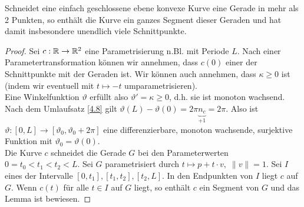 \documentclass[11pt]{scrbook}
\newcommand{\tta}{\vartheta}
\begin{document}
\begin{lem}
\label{5.8}
Schneidet eine einfach geschlossene ebene konvexe Kurve eine Gerade in mehr als 2 Punkten, so enthält die Kurve ein ganzes Segment dieser Geraden und hat damit insbesondere unendlich viele Schnittpunkte. \\
\begin{proof}
Sei $c: \mathbb{R} \to \mathbb{R}^2$ eine Parametrisierung n.Bl. mit Periode $L$. Nach einer Parametertransformation können wir annehmen, dass $c(0)$ einer der Schnittpunkte mit der Geraden ist. Wir können auch annehmen, dass $\kappa \geq 0$ ist (indem wir eventuell mit $t \mapsto -t$ umparametrisieren). \\
Eine Winkelfunktion $\tta$ erfüllt also $\tta' = \kappa \geq 0$, d.h. sie ist monoton wachsend. Nach dem Umlaufsatz \ref{4.8} gilt $\tta(L) - \tta(0) = 2 \pi \underbrace{n_c}_{+1} = 2 \pi$. Also ist $\tta : [0, L] \to [\tta_0, \tta_0 + 2 \pi]$ eine differenzierbare, monoton wachsende, surjektive Funktion mit $\tta_0 = \tta(0)$. \\
Die Kurve $c$ schneidet die Gerade $G$ bei den Parameterwerten $0 = t_0 < t_1 < t_2 < L$. Sei $G$ parametrisiert durch $t \mapsto p + t \cdot v, \; \| v \| = 1$. 
Sei $I$ eines der Intervalle $[0, t_1], [t_1, t_2], [t_2, L]$. In den Endpunkten von $I$ liegt $c$ auf $G$. Wenn $c(t)$ für alle $t \in I$ auf $G$ liegt, so enthält $c$ ein Segment von $G$ und das Lemma ist bewiesen.


\end{proof}
\end{lem}
\end{document}

